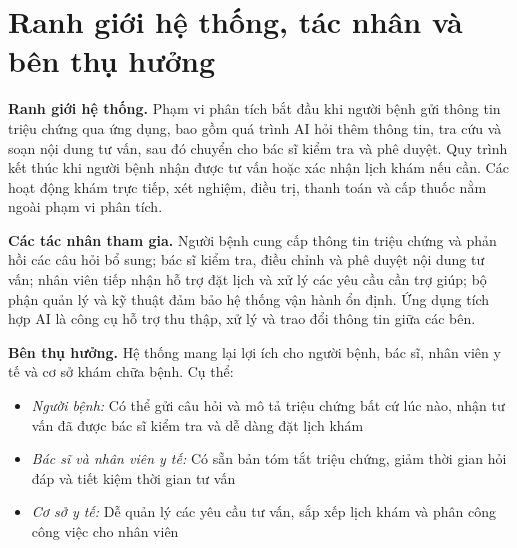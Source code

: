 \section{Ranh giới hệ thống, tác nhân và bên thụ hưởng}
\noindent \textbf{Ranh giới hệ thống.} Phạm vi phân tích bắt đầu khi người bệnh gửi thông tin triệu chứng qua ứng dụng, bao gồm quá trình AI hỏi thêm thông tin, tra cứu và soạn nội dung tư vấn, sau đó chuyển cho bác sĩ kiểm tra và phê duyệt. Quy trình kết thúc khi người bệnh nhận được tư vấn hoặc xác nhận lịch khám nếu cần. Các hoạt động khám trực tiếp, xét nghiệm, điều trị, thanh toán và cấp thuốc nằm ngoài phạm vi phân tích.

\noindent \textbf{Các tác nhân tham gia.} Người bệnh cung cấp thông tin triệu chứng và phản hồi các câu hỏi bổ sung; bác sĩ kiểm tra, điều chỉnh và phê duyệt nội dung tư vấn; nhân viên tiếp nhận hỗ trợ đặt lịch và xử lý các yêu cầu cần trợ giúp; bộ phận quản lý và kỹ thuật đảm bảo hệ thống vận hành ổn định. Ứng dụng tích hợp AI là công cụ hỗ trợ thu thập, xử lý và trao đổi thông tin giữa các bên.

\noindent \textbf{Bên thụ hưởng.} Hệ thống mang lại lợi ích cho người bệnh, bác sĩ, nhân viên y tế và cơ sở khám chữa bệnh. Cụ thể:
\begin{itemize}
    \item \textit{Người bệnh:} Có thể gửi câu hỏi và mô tả triệu chứng bất cứ lúc nào, nhận tư vấn đã được bác sĩ kiểm tra và dễ dàng đặt lịch khám
    \item \textit{Bác sĩ và nhân viên y tế:} Có sẵn bản tóm tắt triệu chứng, giảm thời gian hỏi đáp và tiết kiệm thời gian tư vấn
    \item \textit{Cơ sở y tế:} Dễ quản lý các yêu cầu tư vấn, sắp xếp lịch khám và phân công công việc cho nhân viên
\end{itemize}
